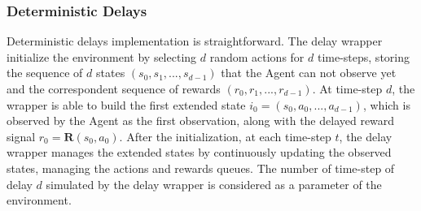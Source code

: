             \subsubsection{Deterministic Delays}
                Deterministic delays implementation is straightforward. The delay wrapper initialize the environment by selecting $d$ random actions for $d$ time-steps, storing the sequence of $d$ states $(s_0, s_1, ..., s_{d-1})$ that the Agent can not observe yet and the correspondent sequence of rewards $(r_0, r_1, ..., r_{d-1})$. At time-step $d$, the wrapper is able to build the first extended state $i_0 = (s_0, a_0, ..., a_{d-1})$, which is observed by the Agent as the first observation, along with the delayed reward signal $r_0 = \mathbf{R}(s_0, a_0)$. After the initialization, at each time-step $t$, the delay wrapper manages the extended states by continuously updating the observed states, managing the actions and rewards queues. The number of time-step of delay $d$ simulated by the delay wrapper is considered as a parameter of the environment.
            
